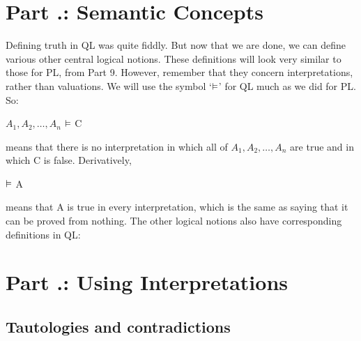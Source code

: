 \section{Part \thechapcount.\theseccount: Semantic Concepts}
Defining truth in QL was quite fiddly. But now that we are done, we can define various other central logical notions. These definitions will look very similar to those for PL, from Part 9. However, remember that they concern interpretations, rather than valuations. We will use the symbol ‘$\vDash$’ for QL much as we did for PL. So:
\begin{center}
$A_1,A_2,\ldots,A_n$ $\vDash$ C
\end{center}
means that there is no interpretation in which all of $A_1,A_2,\ldots,A_n$ are true and in which C is false. Derivatively,
\begin{center}
$\vDash$ A
\end{center}
means that A is true in every interpretation, which is the same as saying that it can be proved from nothing. The other logical notions also have corresponding definitions in QL:
\section{Part \thechapcount.\theseccount: Using Interpretations}
\subsection{Tautologies and contradictions}

